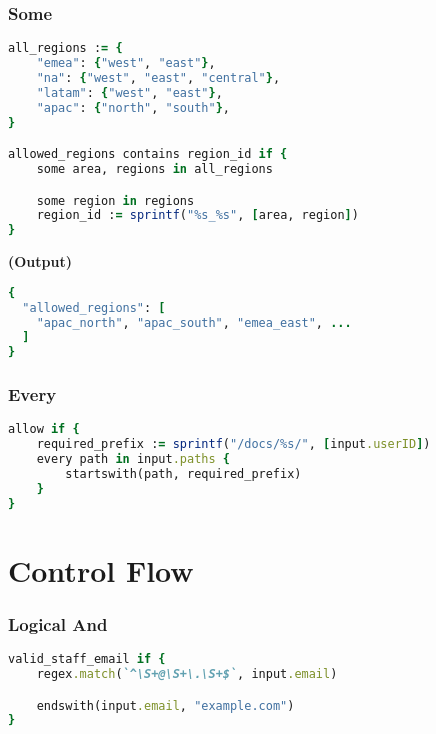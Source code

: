 \documentclass[twocolumn]{article}
\begin{document}
\vspace{-1em}
\subsubsection*{Some}

\begin{lstlisting}[language=Ruby]
all_regions := {
	"emea": {"west", "east"},
	"na": {"west", "east", "central"},
	"latam": {"west", "east"},
	"apac": {"north", "south"},
}

allowed_regions contains region_id if {
	some area, regions in all_regions

	some region in regions
	region_id := sprintf("%s_%s", [area, region])
}
\end{lstlisting}



\textbf{\tiny{(Output)}}
\begin{lstlisting}[language=Ruby]
{
  "allowed_regions": [
    "apac_north", "apac_south", "emea_east", ...
  ]
}
\end{lstlisting}



\vspace{-1em}
\subsubsection*{Every}

\begin{lstlisting}[language=Ruby]
allow if {
	required_prefix := sprintf("/docs/%s/", [input.userID])
	every path in input.paths {
		startswith(path, required_prefix)
	}
}
\end{lstlisting}









\section*{Control Flow}




\vspace{-1em}
\subsubsection*{Logical And}

\begin{lstlisting}[language=Ruby]
valid_staff_email if {
	regex.match(`^\S+@\S+\.\S+$`, input.email)

	endswith(input.email, "example.com")
}
\end{lstlisting}
\end{document}
